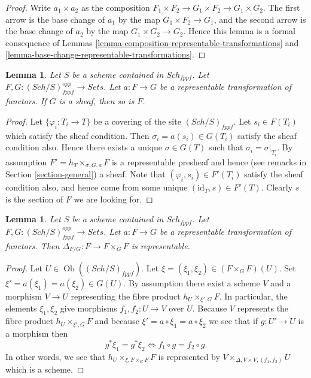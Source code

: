 \documentclass{stacks-project}
\theoremstyle{plain}
\newtheorem{lemma}[subsection]{Lemma}
\theoremstyle{definition}
\theoremstyle{remark}
\numberwithin{equation}{subsection}
\def\Sch{\mathit{Sch}}
\def\Ob{\mathop{\mathrm{Ob}}\nolimits}
\begin{document}
\begin{proof}
Write $a_1 \times a_2$ as the composition
$F_1 \times F_2 \to G_1 \times F_2 \to G_1 \times G_2$.
The first arrow is the base change of $a_1$ by the map
$G_1 \times F_2 \to G_1$, and the second arrow
is the base change of $a_2$ by the map
$G_1 \times G_2 \to G_2$. Hence this lemma is a formal
consequence of Lemmas \ref{lemma-composition-representable-transformations}
and \ref{lemma-base-change-representable-transformations}.
\end{proof}

\begin{lemma}
\label{lemma-representable-transformation-to-sheaf}
Let $S$ be a scheme contained in $\Sch_{fppf}$.
Let $F, G : (\Sch/S)_{fppf}^{opp} \to \textit{Sets}$.
Let $a : F \to G$ be a representable transformation of functors.
If $G$ is a sheaf, then so is $F$.
\end{lemma}

\begin{proof}
Let $\{\varphi_i : T_i \to T\}$ be a covering of the site
$(\Sch/S)_{fppf}$.
Let $s_i \in F(T_i)$ which satisfy the sheaf condition.
Then $\sigma_i = a(s_i) \in G(T_i)$ satisfy the sheaf condition
also. Hence there exists a unique $\sigma \in G(T)$ such
that $\sigma_i = \sigma|_{T_i}$. By assumption
$F' = h_T \times_{\sigma, G, a} F$ is a representable presheaf
and hence (see remarks in Section \ref{section-general}) a sheaf.
Note that $(\varphi_i, s_i) \in F'(T_i)$ satisfy the
sheaf condition also, and hence come from some unique
$(\text{id}_T, s) \in F'(T)$. Clearly $s$ is the section of
$F$ we are looking for.
\end{proof}

\begin{lemma}
\label{lemma-representable-transformation-diagonal}
Let $S$ be a scheme contained in $\Sch_{fppf}$.
Let $F, G : (\Sch/S)_{fppf}^{opp} \to \textit{Sets}$.
Let $a : F \to G$ be a representable transformation of functors.
Then $\Delta_{F/G} : F \to F \times_G F$ is representable.
\end{lemma}

\begin{proof}
Let $U \in \Ob((\Sch/S)_{fppf})$. Let
$\xi = (\xi_1, \xi_2) \in (F \times_G F)(U)$.
Set $\xi' = a(\xi_1) = a(\xi_2) \in G(U)$.
By assumption there exist a scheme $V$ and a morphism $V \to U$
representing the fibre product $h_U \times_{\xi', G} F$.
In particular, the elements $\xi_1, \xi_2$ give morphisms
$f_1, f_2 : U \to V$ over $U$. Because $V$ represents the
fibre product $h_U \times_{\xi', G} F$ and because
$\xi' = a \circ \xi_1 = a \circ \xi_2$
we see that if $g : U' \to U$ is a morphism then
$$
g^*\xi_1 = g^*\xi_2
\Leftrightarrow
f_1 \circ g = f_2 \circ g.
$$
In other words, we see that $h_U \times_{\xi, F \times_G F} F$
is represented by $V \times_{\Delta, V \times V, (f_1, f_2)} U$
which is a scheme.
\end{proof}
\end{document}
